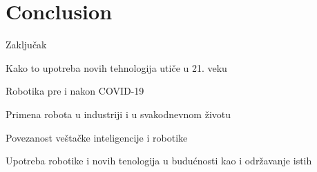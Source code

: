 \documentclass{beamer}
\begin{document}
\section{Conclusion}
\begin{frame}{Zaključak}
\item Kako to upotreba novih tehnologija utiče u 21. veku
\item Robotika pre i nakon COVID-19
\item Primena robota u industriji i u svakodnevnom životu
\item Povezanost veštačke inteligencije i robotike
\item Upotreba robotike i novih tenologija u budućnosti kao i održavanje istih
    
\end{frame}
\end{document}
